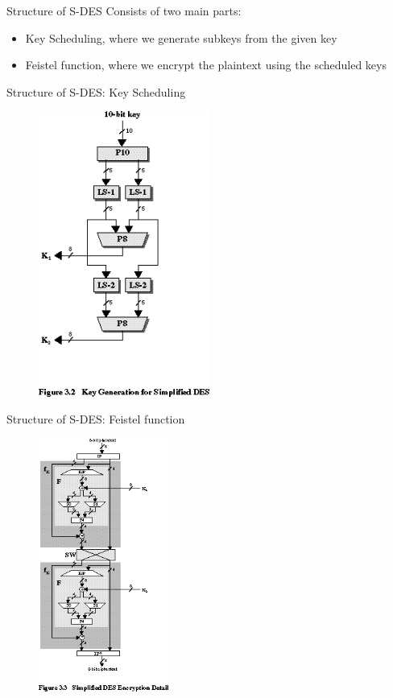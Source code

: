 \documentclass{beamer}
\begin{document}
	\begin{frame}{Structure of S-DES}
		Consists of two main parts:
		\begin{itemize}
			\item Key Scheduling, where we generate subkeys from the given key
			\item Feistel function, where we encrypt the plaintext using the scheduled keys
		\end{itemize}
	\end{frame}
	
	\begin{frame}{Structure of S-DES: Key Scheduling}
		\begin{figure}[h]
			\centering
			\includegraphics[width=0.5\textwidth]{./Images/keygen.png}
		\end{figure}
	\end{frame}
	
	\begin{frame}{Structure of S-DES: Feistel function}
		\begin{figure}[h]
			\centering
			\includegraphics[width=0.38\textwidth]{./Images/feistel.png}
		\end{figure}
	\end{frame}
	
\end{document}
